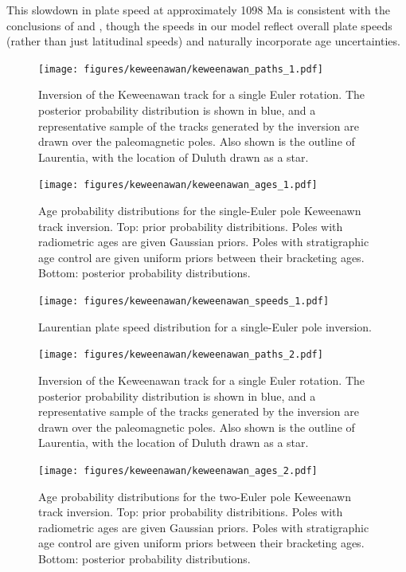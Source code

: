 \documentclass[preprint,12pt,authoryear]{elsarticle}
\begin{document}
This slowdown in plate speed at approximately 1098 Ma is consistent with the conclusions of
\citet{davis1997geochronology} and \citet{swanson2009no}, though the speeds in our
model reflect overall plate speeds (rather than just latitudinal speeds) and naturally incorporate age uncertainties.

\begin{figure}
\texttt{[image: figures/keweenawan/keweenawan\_paths\_1.pdf]}
\caption[Inversion of the Keweenawan track for a single Euler rotation]{Inversion of the Keweenawan track for a single Euler rotation. The posterior probability distribution is shown in blue, and a representative sample of the tracks generated by the inversion are drawn over the paleomagnetic poles. Also shown is the outline of Laurentia, with the location of Duluth drawn as a star.}
\label{fig:keweenawan_paths_1}
\end{figure}
\begin{figure}
\texttt{[image: figures/keweenawan/keweenawan\_ages\_1.pdf]}
\caption[Age probability distributions for the single-Euler pole Keweenawan track inversion]{Age probability distributions for the single-Euler pole Keweenawn track inversion. Top: prior probability distribitions. Poles with radiometric ages are given Gaussian priors. Poles with stratigraphic age control are given uniform priors between their bracketing ages. Bottom: posterior probability distributions.}
\label{fig:keweenawan_ages_1}
\end{figure}
\begin{figure}
\texttt{[image: figures/keweenawan/keweenawan\_speeds\_1.pdf]}
\caption[Laurentian plate speed distribution for a single-Euler pole inversion]{Laurentian plate speed distribution for a single-Euler pole inversion.}
\label{fig:keweenawan_speeds_1}
\end{figure}
\begin{figure}
\texttt{[image: figures/keweenawan/keweenawan\_paths\_2.pdf]}
\caption[Inversion of the Keweenawan track for two Euler rotations]{Inversion of the Keweenawan track for a single Euler rotation. The posterior probability distribution is shown in blue, and a representative sample of the tracks generated by the inversion are drawn over the paleomagnetic poles. Also shown is the outline of Laurentia, with the location of Duluth drawn as a star.}
\label{fig:keweenawan_paths_2}
\end{figure}
\begin{figure}
\texttt{[image: figures/keweenawan/keweenawan\_ages\_2.pdf]}
\caption[Age probability distributions for the two-Euler pole Keweenawan track inversion]{Age probability distributions for the two-Euler pole Keweenawn track inversion. Top: prior probability distribitions. Poles with radiometric ages are given Gaussian priors. Poles with stratigraphic age control are given uniform priors between their bracketing ages. Bottom: posterior probability distributions.}
\label{fig:keweenawan_ages_2}
\end{figure}
\end{document}
